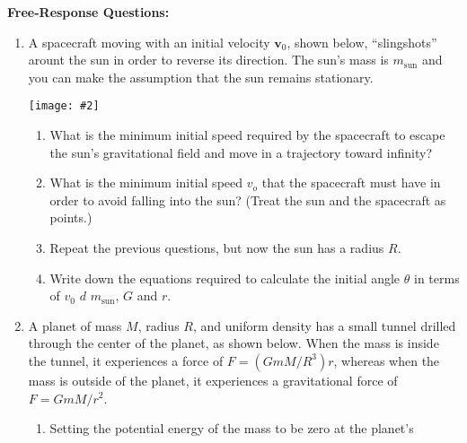 \documentclass[12pt]{article}
\newcommand{\pic}[2]{\texttt{[image: \#2]}}
\newcommand{\mb}[1]{\mathbf{#1}}
\begin{document}
\newpage
\noindent\textbf{Free-Response Questions:}

\begin{enumerate}[leftmargin=15pt]

\item A spacecraft moving with an initial velocity $\mb{v}_0$, shown below,
  ``slingshots'' arount the sun in order to reverse its direction. The sun's
  mass is $m_\mathrm{sun}$ and you can make the assumption that the sun remains
  stationary.\\
  \begin{minipage}{0.28\textwidth}
    \pic{1.25}{shuttle.jpg}
  \end{minipage}
  \begin{minipage}{0.7\textwidth}
    \begin{enumerate}[noitemsep]
    \item What is the minimum initial speed required by the spacecraft to escape
      the sun's gravitational field and move in a trajectory toward infinity?
    \item What is the minimum initial speed $v_o$ that the spacecraft must have
      in order to avoid falling into the sun? (Treat the sun and the spacecraft
      as points.)
    \item Repeat the previous questions, but now the sun has a radius $R$.
    \item Write down the equations required to calculate the initial angle
      $\theta$ in terms of $v_0$ $d$ $m_\mathrm{sun}$, $G$ and $r$.
    \end{enumerate}
  \end{minipage}
  \newpage
\item A planet of mass $M$, radius $R$, and uniform density has a small tunnel
  drilled through the center of the planet, as shown below. When the mass is
  inside the tunnel, it experiences a force of $F=(GmM/R^3)r$, whereas when the
  mass is outside of the planet, it experiences a gravitational force of
  $F=GmM/r^2$.
  \begin{center}
  \end{center}
  \begin{enumerate}[noitemsep,leftmargin=20pt]
  \item Setting the potential energy of the mass to be zero at the planet's

\end{enumerate}
\end{enumerate}
\end{document}

